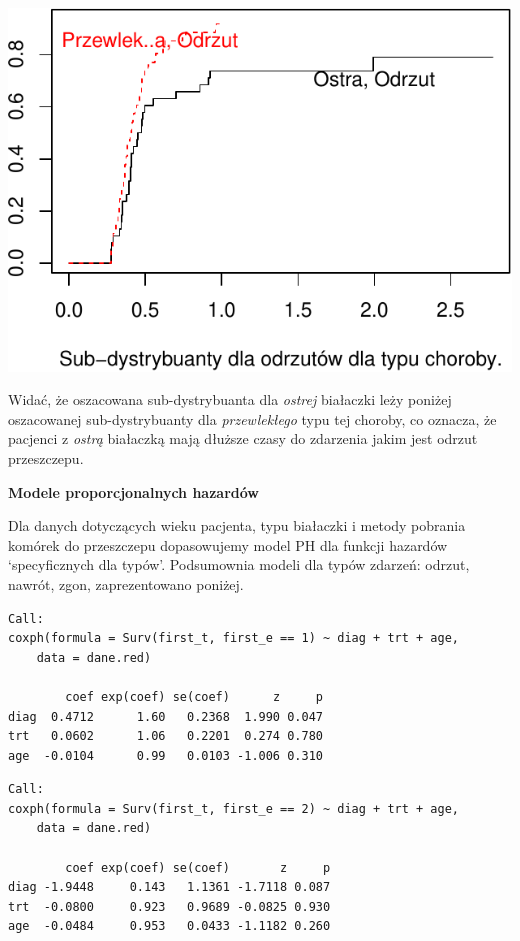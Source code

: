 \documentclass[]{article}
\begin{document}
\begin{center}\includegraphics{figure/beamer-unnamed-chunk-8-1} \end{center}

Widać, że oszacowana sub-dystrybuanta dla \emph{ostrej} białaczki leży
poniżej oszacowanej sub-dystrybuanty dla \emph{przewlekłego} typu tej
choroby, co oznacza, że pacjenci z \emph{ostrą} białaczką mają dłuższe
czasy do zdarzenia jakim jest odrzut przeszczepu.

\newpage
\textbf{Modele proporcjonalnych hazardów}

Dla danych dotyczących wieku pacjenta, typu białaczki i metody pobrania
komórek do przeszczepu dopasowujemy model PH dla funkcji hazardów
`specyficznych dla typów'. Podsumownia modeli dla typów zdarzeń: odrzut,
nawrót, zgon, zaprezentowano poniżej.

\begin{verbatim}
Call:
coxph(formula = Surv(first_t, first_e == 1) ~ diag + trt + age, 
    data = dane.red)

        coef exp(coef) se(coef)      z     p
diag  0.4712      1.60   0.2368  1.990 0.047
trt   0.0602      1.06   0.2201  0.274 0.780
age  -0.0104      0.99   0.0103 -1.006 0.310
\end{verbatim}

\begin{verbatim}
Call:
coxph(formula = Surv(first_t, first_e == 2) ~ diag + trt + age, 
    data = dane.red)

        coef exp(coef) se(coef)       z     p
diag -1.9448     0.143   1.1361 -1.7118 0.087
trt  -0.0800     0.923   0.9689 -0.0825 0.930
age  -0.0484     0.953   0.0433 -1.1182 0.260
\end{verbatim}
\end{document}
